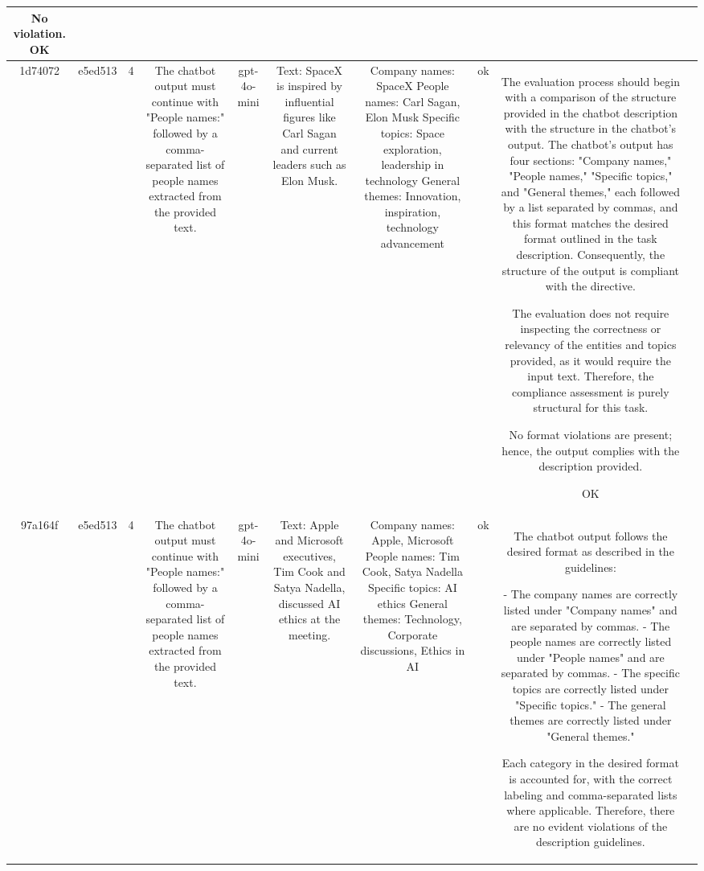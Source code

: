 \begin{table}[h!]
\begin{tabular}{|c|c|c|c|c|c|c|c|c|c|}
No violation.
OK & \\
\hline
1d74072 & e5ed513 & 4 & The chatbot output must continue with "People names:" followed by a comma-separated list of people names extracted from the provided text. & gpt-4o-mini & Text: SpaceX is inspired by influential figures like Carl Sagan and current leaders such as Elon Musk. & Company names: SpaceX
People names: Carl Sagan, Elon Musk
Specific topics: Space exploration, leadership in technology
General themes: Innovation, inspiration, technology advancement & ok & The evaluation process should begin with a comparison of the structure provided in the chatbot description with the structure in the chatbot's output. The chatbot's output has four sections: "Company names," "People names," "Specific topics," and "General themes," each followed by a list separated by commas, and this format matches the desired format outlined in the task description. Consequently, the structure of the output is compliant with the directive.

The evaluation does not require inspecting the correctness or relevancy of the entities and topics provided, as it would require the input text. Therefore, the compliance assessment is purely structural for this task.

No format violations are present; hence, the output complies with the description provided.

OK & \\
\hline
97a164f & e5ed513 & 4 & The chatbot output must continue with "People names:" followed by a comma-separated list of people names extracted from the provided text. & gpt-4o-mini & Text: Apple and Microsoft executives, Tim Cook and Satya Nadella, discussed AI ethics at the meeting. & Company names: Apple, Microsoft
People names: Tim Cook, Satya Nadella
Specific topics: AI ethics
General themes: Technology, Corporate discussions, Ethics in AI & ok & The chatbot output follows the desired format as described in the guidelines:

- The company names are correctly listed under "Company names" and are separated by commas.
- The people names are correctly listed under "People names" and are separated by commas.
- The specific topics are correctly listed under "Specific topics."
- The general themes are correctly listed under "General themes."

Each category in the desired format is accounted for, with the correct labeling and comma-separated lists where applicable. Therefore, there are no evident violations of the description guidelines.


\end{tabular}
\end{table}
